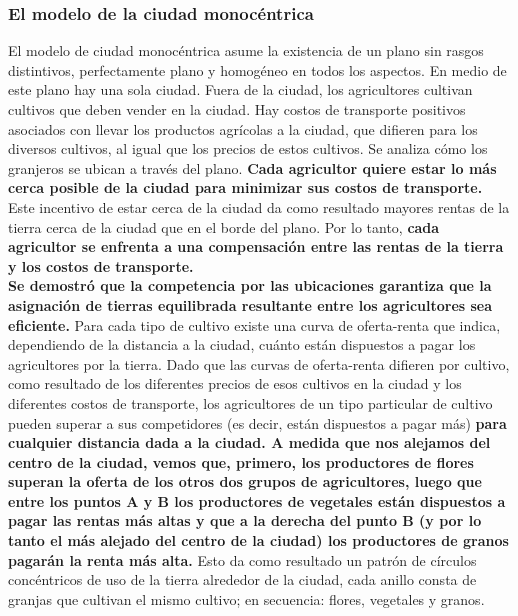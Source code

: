 \subsubsection{El modelo de la ciudad monocéntrica}
El modelo de ciudad monocéntrica asume la existencia de un plano sin rasgos distintivos, perfectamente plano y homogéneo en todos los aspectos. En medio de este plano hay una sola ciudad. Fuera de la ciudad, los agricultores cultivan cultivos que deben vender en la ciudad. Hay costos de transporte positivos asociados con llevar los productos agrícolas a la ciudad, que difieren para los diversos cultivos, al igual que los precios de estos cultivos. Se  analiza cómo los granjeros se ubican a través del plano. \textbf{Cada agricultor quiere estar lo más cerca posible de la ciudad para minimizar sus costos de transporte.} Este incentivo de estar cerca de la ciudad da como resultado mayores rentas de la tierra cerca de la ciudad que en el borde del plano. Por lo tanto, \textbf{cada agricultor se enfrenta a una compensación entre las rentas de la tierra y los costos de transporte.}\\
\textbf{Se demostró que la competencia por las ubicaciones garantiza que la asignación de tierras equilibrada resultante entre los agricultores sea eficiente.} Para cada tipo de cultivo existe una curva de oferta-renta que indica, dependiendo de la distancia a la ciudad, cuánto están dispuestos a pagar los agricultores por la tierra. Dado que las curvas de oferta-renta difieren por cultivo, como resultado de los diferentes precios de esos cultivos en la ciudad y los diferentes costos de transporte, los agricultores de un tipo particular de cultivo pueden superar a sus competidores (es decir, están dispuestos a pagar más) \textbf{para cualquier distancia dada a la ciudad. A medida que nos alejamos del centro de la ciudad,  vemos que, primero, los productores de flores superan la oferta de los otros dos grupos de agricultores, luego que entre los puntos A y B los productores de vegetales están dispuestos a pagar las rentas más altas y que a la derecha del punto B (y por lo tanto el más alejado del centro de la ciudad) los productores de granos pagarán la renta más alta.} Esto da como resultado un patrón de círculos concéntricos de uso de la tierra alrededor de la ciudad, cada anillo consta de granjas que cultivan el mismo cultivo; en secuencia: flores, vegetales y granos.\\

